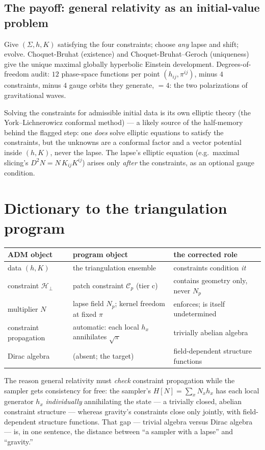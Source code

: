 \documentclass[11pt]{article}
\newcommand{\Hh}{\mathcal{H}}
\newcommand{\C}{\mathcal{C}}
\begin{document}
\subsection{The payoff: general relativity as an initial-value problem}

Give $(\Sigma, h, K)$ satisfying the four constraints; choose \emph{any} lapse and shift;
evolve. Choquet-Bruhat (existence) and Choquet-Bruhat--Geroch (uniqueness) give the
unique maximal globally hyperbolic Einstein development. Degrees-of-freedom audit: $12$
phase-space functions per point $(h_{ij}, \pi^{ij})$, minus $4$ constraints, minus $4$
gauge orbits they generate, $= 4$: the two polarizations of gravitational waves.

Solving the constraints for admissible initial data is its own elliptic theory (the
York--Lichnerowicz conformal method) --- a likely source of the half-memory behind the
flagged step: one \emph{does} solve elliptic equations to satisfy the constraints, but
the unknowns are a conformal factor and a vector potential inside $(h,K)$, never the
lapse. The lapse's elliptic equation (e.g.\ maximal slicing's $D^2N = N\,K_{ij}K^{ij}$)
arises only \emph{after} the constraints, as an optional gauge condition.

\section{Dictionary to the triangulation program}

\begin{center}
\begin{tabular}{@{}lll@{}}
\toprule
ADM object & program object & the corrected role \\
\midrule
data $(h,K)$ & the triangulation ensemble & constraints condition \emph{it} \\
constraint $\Hh_\perp$ & patch constraint $\C_p$ (tier c) & contains geometry only, never $N_p$ \\
multiplier $N$ & lapse field $N_p$; kernel freedom at fixed $\pi$ & enforces; is itself undetermined \\
constraint propagation & automatic: each local $h_x$ annihilates $\sqrt{\pi}$ & trivially abelian algebra \\
Dirac algebra & (absent; the target) & field-dependent structure functions \\
\bottomrule
\end{tabular}
\end{center}

The reason general relativity must \emph{check} constraint propagation while the sampler
gets consistency for free: the sampler's $H[N] = \sum_x N_x h_x$ has each local generator
$h_x$ \emph{individually} annihilating the state --- a trivially closed, abelian
constraint structure --- whereas gravity's constraints close only jointly, with
field-dependent structure functions. That gap --- trivial algebra versus Dirac algebra
--- is, in one sentence, the distance between ``a sampler with a lapse'' and
``gravity.''
\end{document}
